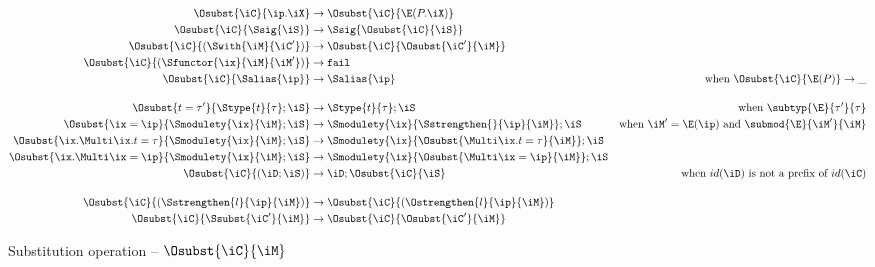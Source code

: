 \begin{align*}
  \Osubst{\iC}{\ip.\iX}
  &\to \Osubst{\iC}{\E(P.\iX)}\\
  \Osubst{\iC}{\Ssig{\iS}}
  &\to \Ssig{\Osubst{\iC}{\iS}}\\
  \Osubst{\iC}{(\Swith{\iM}{\iC'})}
  &\to \Osubst{\iC}{\Osubst{\iC'}{\iM}}\\
  \Osubst{\iC}{(\Sfunctor{\ix}{\iM}{\iM'})}
  &\to \texttt{fail}\\
  \Osubst{\iC}{\Salias{\ip}}
  &\to \Salias{\ip} &\text{when } \Osubst{\iC}{\E(P)}\to \_\\[4mm]
  \Osubst{t = \tau'}{\Stype{t}{\tau};\iS}
  &\to \Stype{t}{\tau};\iS &\text{when } \subtyp{\E}{\tau'}{\tau}\\
  \Osubst{\ix = \ip}{\Smodulety{\ix}{\iM};\iS}
  &\to \Smodulety{\ix}{\Sstrengthen{}{\ip}{\iM}};\iS
  &\text{when } \iM' = \E(\ip) \text{ and } \submod{\E}{\iM'}{\iM}\\
  \Osubst{\ix.\Multi\ix.t = \tau}{\Smodulety{\ix}{\iM};\iS}
  &\to \Smodulety{\ix}{\Osubst{\Multi\ix.t = \tau}{\iM}};\iS\\
  \Osubst{\ix.\Multi\ix = \ip}{\Smodulety{\ix}{\iM};\iS}
  &\to \Smodulety{\ix}{\Osubst{\Multi\ix = \ip}{\iM}};\iS\\
  \Osubst{\iC}{(\iD;\iS)}
  &\to \iD;\Osubst{\iC}{\iS}
  &\text{when } id(\iD) \text{ is not a prefix of } id(\iC)\\[4mm]
  \Osubst{\iC}{(\Sstrengthen{l}{\ip}{\iM})}
  &\to \Osubst{\iC}{(\Ostrengthen{l}{\ip}{\iM})}\\
  \Osubst{\iC}{\Ssubst{\iC'}{\iM}}
  &\to \Osubst{\iC}{\Osubst{\iC'}{\iM}}\\
\end{align*}\vspace{-3mm}
\caption{Substitution operation -- $\Osubst{\iC}{\iM}$}
\label{module:subst}

